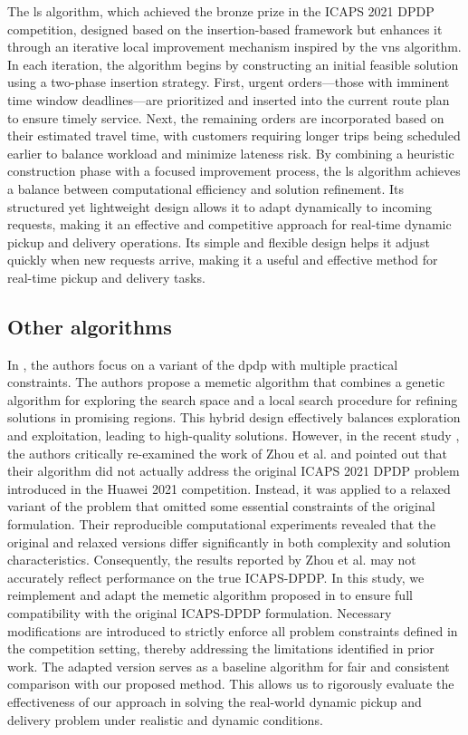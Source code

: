 \documentclass[preprint,12pt]{elsarticle}
\begin{document}
The \gls{ls} algorithm, which achieved the bronze prize in the ICAPS 2021 DPDP competition, designed based on the insertion-based framework but enhances it through an iterative local improvement mechanism inspired by the \gls{vns} algorithm. In each iteration, the algorithm begins by constructing an initial feasible solution using a two-phase insertion strategy. First, urgent orders—those with imminent time window deadlines—are prioritized and inserted into the current route plan to ensure timely service. Next, the remaining orders are incorporated based on their estimated travel time, with customers requiring longer trips being scheduled earlier to balance workload and minimize lateness risk.
By combining a heuristic construction phase with a focused improvement process, the \gls{ls} algorithm achieves a balance between computational efficiency and solution refinement. Its structured yet lightweight design allows it to adapt dynamically to incoming requests, making it an effective and competitive approach for real-time dynamic pickup and delivery operations. Its simple and flexible design helps it adjust quickly when new requests arrive, making it a useful and effective method for real-time pickup and delivery tasks.

\subsection{Other algorithms}
\label{sec:other_algo}
In \cite{zhou2024memetic}, the authors focus on a variant of the \gls{dpdp} with multiple practical constraints. The authors propose a memetic algorithm that combines a genetic algorithm for exploring the search space and a local search procedure for refining solutions in promising regions. This hybrid design effectively balances exploration and exploitation, leading to high-quality solutions. However, in the recent study \cite{horvath2025recent}, the authors critically re-examined the work of Zhou et al. and pointed out that their algorithm did not actually address the original ICAPS 2021 DPDP problem introduced in the Huawei 2021 competition. Instead, it was applied to a relaxed variant of the problem that omitted some essential constraints of the original formulation. Their reproducible computational experiments revealed that the original and relaxed versions differ significantly in both complexity and solution characteristics. Consequently, the results reported by Zhou et al. may not accurately reflect performance on the true ICAPS-DPDP. In this study, we reimplement and adapt the memetic algorithm proposed in \cite{zhou2024memetic} to ensure full compatibility with the original ICAPS-DPDP formulation. Necessary modifications are introduced to strictly enforce all problem constraints defined in the competition setting, thereby addressing the limitations identified in prior work. The adapted version serves as a baseline algorithm for fair and consistent comparison with our proposed method. This allows us to rigorously evaluate the effectiveness of our approach in solving the real-world dynamic pickup and delivery problem under realistic and dynamic conditions.
\end{document}
